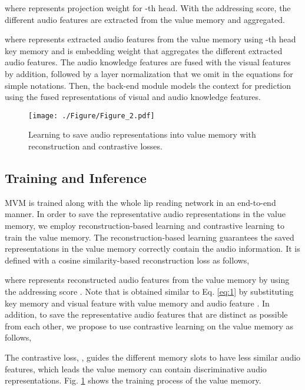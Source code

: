 \documentclass[letterpaper]{article} \usepackage{aaai22}  \usepackage{times}  \usepackage{helvet}  \usepackage{courier}  \usepackage[hyphens]{url}  \usepackage{graphicx} \urlstyle{rm} \def\UrlFont{\rm}  \usepackage{natbib}  \usepackage{caption} \DeclareCaptionStyle{ruled}{labelfont=normalfont,labelsep=colon,strut=off} \frenchspacing  \setlength{\pdfpagewidth}{8.5in}  \setlength{\pdfpageheight}{11in}  \usepackage{algorithm}
\begin{document}
where  represents projection weight for -th head. With the addressing score, the  different audio features are extracted from the value memory and aggregated.


where  represents extracted audio features from the value memory using -th head key memory and  is embedding weight that aggregates the  different extracted audio features. The audio knowledge features  are fused with the visual features  by addition, followed by a layer normalization \cite{ba2016layernorm} that we omit in the equations for simple notations. Then, the back-end module models the context for prediction using the fused representations of visual and audio knowledge features.

\begin{figure}[t!]
	\begin{minipage}[b]{1.0\linewidth}
		\centering
		\centerline{\texttt{[image: ./Figure/Figure\_2.pdf]}}
	\end{minipage}
	\caption{Learning to save audio representations into value memory with reconstruction and contrastive losses.}
	\label{fig:2}
\end{figure}


\subsection{Training and Inference}
MVM is trained along with the whole lip reading network in an end-to-end manner. In order to save the representative audio representations in the value memory, we employ reconstruction-based learning and contrastive learning to train the value memory. The reconstruction-based learning guarantees the saved representations in the value memory correctly contain the audio information. It is defined with a cosine similarity-based reconstruction loss as follows,

where  represents reconstructed audio features from the value memory  by using the addressing score . Note that  is obtained similar to Eq. \ref{eq:1} by substituting key memory  and visual feature  with value memory  and audio feature . In addition, to save the representative audio features that are distinct as possible from each other, we propose to use contrastive learning on the value memory as follows,

The contrastive loss, , guides the different memory slots to have less similar audio features, which leads the value memory can contain discriminative audio representations. Fig. \ref{fig:2} shows the training process of the value memory.
\end{document}
